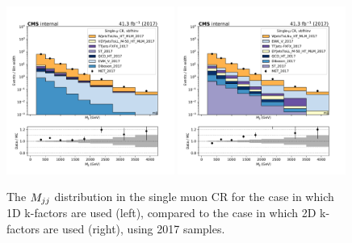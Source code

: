 \begin{figure}
    \begin{center}
        \includegraphics[width=0.49\textwidth]{fig/datamc_1dkfac/cr_1m_vbf/cr_1m_vbf_mjj_losf_2017.pdf}
        \includegraphics[width=0.49\textwidth]{fig/datamc/cr_1m_vbf/cr_1m_vbf_mjj_losf_2017.pdf} 
        \caption{The $M_{jj}$ distribution in the single muon CR for the case in which 1D k-factors are used (left), 
        compared to the case in which 2D k-factors are used (right), using 2017 samples.}
        \label{fig:mjj_2017}
    \end{center}
\end{figure}

